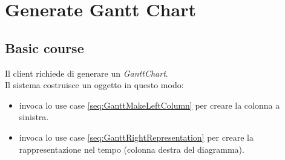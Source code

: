 \section{Generate Gantt Chart}
\label{seq:GanttMakePDF}

\subsection{Basic course}
Il client richiede di generare un \emph{GanttChart}.\\
Il sistema costruisce un oggetto in questo modo:
\begin{itemize}
  \item invoca lo use case \ref{seq:GanttMakeLeftColumn} per creare la
  colonna a sinistra.
  \item invoca lo use case \ref{seq:GanttRightRepresentation} per creare
  la rappresentazione nel tempo (colonna destra del diagramma).
\end{itemize}

